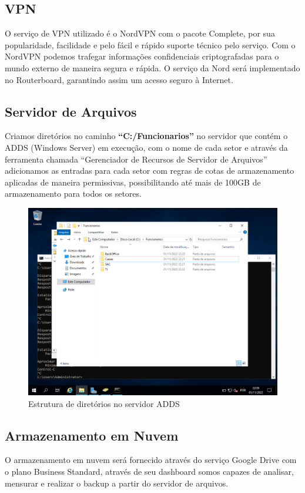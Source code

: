 \documentclass[12pt]{article}
\begin{document}
\subsection{VPN}
O serviço de VPN utilizado é o NordVPN com o pacote Complete, por sua popularidade, facilidade e pelo fácil e rápido suporte técnico pelo serviço. Com o NordVPN podemos trafegar informações confidenciais criptografadas para o mundo externo de maneira segura e rápida. O serviço da Nord será implementado no Routerboard, garantindo assim um acesso seguro à Internet.

\subsection{Servidor de Arquivos}
Criamos diretórios no caminho \textbf{“C:/Funcionarios”} no servidor que contém o ADDS (Windows Server) em execução, com o nome de cada setor e através da ferramenta chamada “Gerenciador de Recursos de Servidor de Arquivos” adicionamos as entradas para cada setor com regras de cotas de armazenamento aplicadas de maneira permissivas, possibilitando até mais de 100GB de armazenamento para todos os setores.

\begin{figure}[ht]
\centering
\includegraphics[height=0.5\textwidth]{adds-pasta-compartilhada.png}
\caption{Estrutura de diretórios no servidor ADDS}
\label{fig:adds-pastas}
\end{figure}

\subsection{Armazenamento em Nuvem}
O armazenamento em nuvem será fornecido através do serviço Google Drive com o plano Business Standard, através de seu dashboard somos capazes de analisar, mensurar e realizar o backup a partir do servidor de arquivos.
\end{document}
